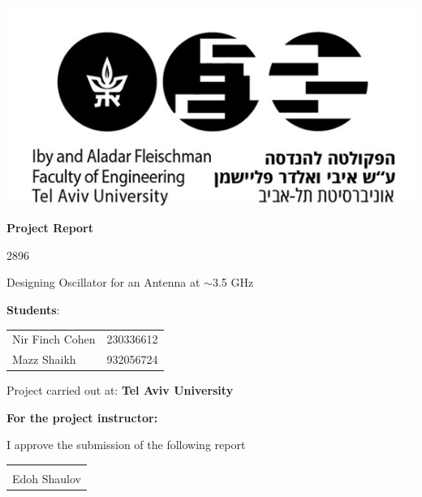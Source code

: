 \documentclass[]{extarticle}
\begin{document}
\begin{titlepage}
    \centering
    \includegraphics[scale=0.8]{TAU.png}\par\vspace{1cm}
    {\LARGE\bfseries Project Report\par}
    \vspace{1cm}
    {\Large 2896\par}
    \vspace{0.5cm}
    {\Large Designing Oscillator for an Antenna at $\sim$3.5 GHz\par}
    \vspace{1cm}
    
    \Large \textbf{Students}:\par
    \vspace{0.5cm}
    \begin{tabular}{l l}
        Nir Finch Cohen & 230336612 \\
        Mazz Shaikh & 932056724 \\
    \end{tabular}\par
    \vspace{1cm}
    
    \Large Project carried out at: \textbf{Tel Aviv University}\par
    \vspace{1cm}
    
    \Large \textbf{For the project instructor:}\par
    \vspace{0.3cm}
    
    I approve the submission of the following report\par
    \vspace{1cm}
    
    \begin{flushright}
        \begin{tabular}{l}
            \\
            \\
            Edoh Shaulov \\
        \end{tabular}
    \end{flushright}
\end{titlepage}
\end{document}

